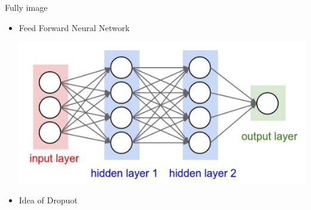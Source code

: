 \documentclass[aspectratio=169]{beamer}
\begin{document}
\begin{frame}{Fully image}
    \begin{itemize}
        \item Feed Forward Neural Network
    \begin{center}
        \includegraphics[scale=0.6]{./images/net.JPG}
    \end{center}
        \item Idea of Dropuot
    \end{itemize}
\end{frame}
\end{document}
